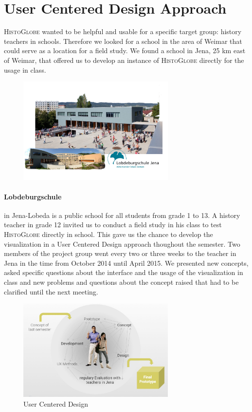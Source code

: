 \section{User Centered Design Approach}

\textsc{HistoGlobe} wanted to be helpful and usable for a specific target group: history teachers in schools. Therefore we looked for a school in the area of Weimar that could serve as a location for a field study. We found a school in Jena, 25 km east of Weimar, that offered us to develop an instance of \textsc{HistoGlobe} directly for the usage in class.

\begin{figure}[H]
  \centering
  \includegraphics[width=0.7\textwidth]{graphics/lobdeburgschule.jpg}
\end{figure}

\paragraph{Lobdeburgschule} in Jena-Lobeda is a public school for all students from grade 1 to 13. A history teacher in grade 12 invited us to conduct a field study in his class to test \textsc{HistoGlobe} directly in school. This gave us the chance to develop the visualization in a User Centered Design approach thoughout the semester. Two members of the project group went every two or three weeks to the teacher in Jena in the time from October 2014 until April 2015. We presented new concepts, asked specific questions about the interface and the usage of the visualization in class and new problems and questions about the concept raised that had to be clarified until the next meeting.

\begin{figure}[H]
  \centering
  \includegraphics[width=0.7\textwidth]{graphics/design-1.jpg}
  \caption{User Centered Design}
\end{figure}

